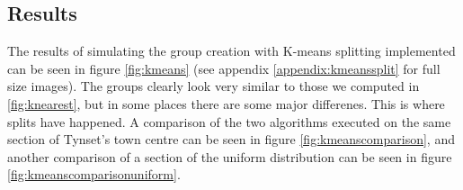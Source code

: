 \subsection{Results}
The results of simulating the group creation with K-means splitting implemented can be seen in figure \ref{fig:kmeans} (see 
appendix \ref{appendix:kmeanssplit} for full size images). The groups clearly look very similar to those we computed in \ref{fig:knearest}, but in some places there are some major differenes. This is where splits have happened. A comparison of the two algorithms executed on the same section of Tynset's town centre can be seen in figure \ref{fig:kmeanscomparison}, and another
comparison of a section of the uniform distribution can be seen in figure \ref{fig:kmeanscomparisonuniform}. 

\begin{figure}
	\centering
		\qquad
		\qquad


\end{figure}
